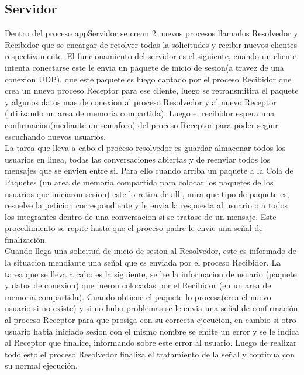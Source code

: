 \documentclass[a4paper,12pt,titlepage]{article}
\begin{document}
\subsection{Servidor}

Dentro del proceso appServidor se crean 2 nuevos procesos llamados Resolvedor y Recibidor que se encargar de resolver todas la solicitudes y recibir nuevos clientes respectivamente.
El funcionamiento del servidor es el siguiente, cuando un cliente intenta conectarse este le envia un paquete de inicio de sesion(a travez de una conexion UDP), que este paquete es luego captado por el proceso Recibidor que crea un nuevo proceso Receptor para ese cliente, luego se retransmitira el paquete y algunos datos mas de conexion al proceso Resolvedor y al nuevo Receptor (utilizando un area de memoria compartida). Luego el recibidor espera una confirmacion(mediante un semaforo) del proceso Receptor para poder seguir escuchando nuevos usuarios.\\

La tarea que lleva a cabo el proceso resolvedor es guardar almacenar todos los usuarios en linea, todas las conversaciones abiertas y de reenviar todos los mensajes que se envien entre si. Para ello cuando arriba un paquete a la Cola de Paquetes (un area de memoria compartida para colocar los paquetes de los usuarios que iniciaron sesion) este lo retira de alli, mira que tipo de paquete es, resuelve la peticion correspondiente y le envia la respuesta al usuario o a todos los integrantes dentro de una conversacion si se tratase de un mensaje. Este procedimiento se repite hasta que el proceso padre le envie una señal de finalización.\\

Cuando llega una solicitud de inicio de sesion al Resolvedor, este es informado de la situacion mendiante una señal que es enviada por el proceso Recibidor. La tarea que se lleva a cabo es la siguiente, se lee la informacion de usuario (paquete y datos de conexion) que fueron colocadas por el Recibidor (en un area de memoria compartida). Cuando obtiene el paquete lo procesa(crea el nuevo usuario si no existe) y si no hubo problemas se le envia una señal de confirmación al proceso Receptor para que prosiga con su correcta ejecucion, en cambio si otro usuario habia iniciado sesion con el mismo nombre se emite un error y se le indica al Receptor que finalice, informando sobre este error al usuario. Luego de realizar todo esto el proceso Resolvedor finaliza el tratamiento de la señal y continua con su normal ejecución.\\
\end{document}
